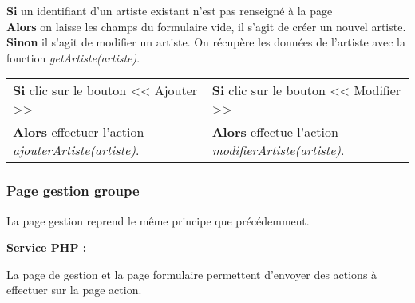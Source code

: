             \begin{paragraphe}
                \textbf{Si} un identifiant d'un artiste existant n'est pas renseigné à la page \\
                \textbf{Alors} on laisse les champs du formulaire vide, il s'agit de créer un nouvel artiste. \\
                \textbf{Sinon} il s'agit de modifier un artiste. On récupère les données de l'artiste avec la fonction \emph{getArtiste(artiste)}.
            \end{paragraphe}
            
        \newpage
            
            \begin{center}
                \begin{tabular}{l | l}
                    \textbf{Si} clic sur le bouton << Ajouter >> & \textbf{Si} clic sur le bouton << Modifier >> \\
                    \textbf{Alors} effectuer l'action \emph{ajouterArtiste(artiste)}. & \textbf{Alors} effectue l'action \emph{modifierArtiste(artiste)}.
                \end{tabular}
            \end{center}
            
			

    \clearpage

		\subsubsection{Page gestion groupe}

			\begin{paragraphe}
                La page gestion reprend le même principe que précédemment. 
			\end{paragraphe}

			\begin{paragraphe}
				\textbf{Service PHP :}
			\end{paragraphe}
            
            \begin{paragraphe}
                La page de gestion et la page formulaire permettent d'envoyer des actions à effectuer sur la page action.
			\end{paragraphe}

